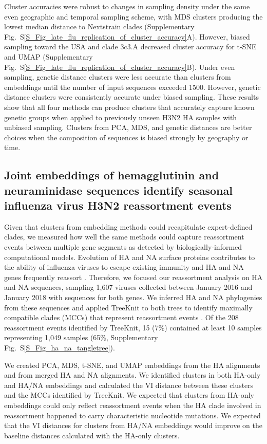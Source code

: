 \documentclass[webpdf,contemporary,large,single]{oup-authoring-template}%
\theoremstyle{thmstyleone}%
\theoremstyle{thmstyletwo}%
\theoremstyle{thmstylethree}%
\begin{document}
Cluster accuracies were robust to changes in sampling density under the same even geographic and temporal sampling scheme, with MDS clusters producing the lowest median distance to Nextstrain clades (Supplementary Fig.~S\ref{S_Fig_late_flu_replication_of_cluster_accuracy}A).
However, biased sampling toward the USA and clade 3c3.A decreased cluster accuracy for t-SNE and UMAP (Supplementary Fig.~S\ref{S_Fig_late_flu_replication_of_cluster_accuracy}B).
Under even sampling, genetic distance clusters were less accurate than clusters from embeddings until the number of input sequences exceeded 1500.
However, genetic distance clusters were consistently accurate under biased sampling.
These results show that all four methods can produce clusters that accurately capture known genetic groups when applied to previously unseen H3N2 HA samples with unbiased sampling.
Clusters from PCA, MDS, and genetic distances are better choices when the composition of sequences is biased strongly by geography or time.

\subsection{Joint embeddings of hemagglutinin and neuraminidase sequences identify seasonal influenza virus H3N2 reassortment events}

Given that clusters from embedding methods could recapitulate expert-defined clades, we measured how well the same methods could capture reassortment events between multiple gene segments as detected by biologically-informed computational models.
Evolution of HA and NA surface proteins contributes to the ability of influenza viruses to escape existing immunity \citep{Petrova2018} and HA and NA genes frequently reassort \citep{Nelson2008,Marshall2013,Potter2019}.
Therefore, we focused our reassortment analysis on HA and NA sequences, sampling 1,607 viruses collected between January 2016 and January 2018 with sequences for both genes.
We inferred HA and NA phylogenies from these sequences and applied TreeKnit to both trees to identify maximally compatible clades (MCCs) that represent reassortment events \citep{Barrat-Charlaix2022}.
Of the 208 reassortment events identified by TreeKnit, 15 (7\%) contained at least 10 samples representing 1,049 samples (65\%, Supplementary Fig.~S\ref{S_Fig_ha_na_tangletree}).

We created PCA, MDS, t-SNE, and UMAP embeddings from the HA alignments and from merged HA and NA alignments.
We identified clusters in both HA-only and HA/NA embeddings and calculated the VI distance between these clusters and the MCCs identified by TreeKnit.
We expected that clusters from HA-only embeddings could only reflect reassortment events when the HA clade involved in reassortment happened to carry characteristic nucleotide mutations.
We expected that the VI distances for clusters from HA/NA embeddings would improve on the baseline distances calculated with the HA-only clusters.
\end{document}
